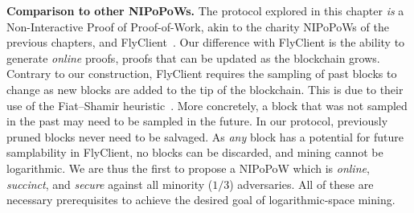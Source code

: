 \noindent
\textbf{Comparison to other NIPoPoWs.} The protocol explored in this chapter
\emph{is} a Non-In\-ter\-active Proof of Proof-of-Work,
akin to the charity NIPoPoWs of the previous chapters, and FlyClient~\cite{flyclient}. Our difference with
FlyClient is the ability to generate \emph{online} proofs, proofs that can be updated as the
blockchain grows. Contrary to our construction, FlyClient requires the sampling of past blocks
to change as new blocks are added to the tip of the blockchain. This is due to their use of the
Fiat--Shamir heuristic~\cite{fiatshamir}. More concretely, a block that was not sampled in the
past may need to be sampled in the future. In our protocol, previously pruned blocks never need
to be salvaged. As \emph{any} block has a potential for future samplability in FlyClient, no
blocks can be discarded, and mining cannot be logarithmic.
We are thus the first to propose a NIPoPoW which is \emph{online}, \emph{succinct}, and
\emph{secure} against all minority ($1/3$) adversaries. All of these are necessary prerequisites
to achieve the desired goal of logarithmic-space mining.
